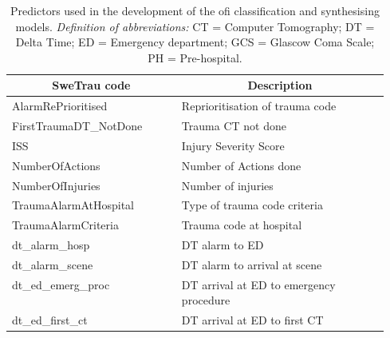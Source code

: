 \documentclass[12pt, letterpaper]{article}
\begin{document}
\begin{appendices}
    \renewcommand*{\arraystretch}{1.2}
    \begin{longtable}[c]{@{}|l|p{0.55\linewidth}|@{}}
        \caption{Predictors used in the development of the \acrlong{ofi} classification and synthesising models. \textit{Definition of abbreviations:} CT = Computer Tomography; DT = Delta Time; ED = Emergency department; GCS = Glascow Coma Scale; PH = Pre-hospital.}%
        \label{tab:predictors}                                                                                          \\
        \hline
        \multicolumn{1}{|c|}{\textbf{SweTrau code}} & \multicolumn{1}{|c|}{\textbf{Description}}                        \\\hline
        \endfirsthead
        \endhead
        AlarmRePrioritised                          & Reprioritisation of trauma code                                   \\\hline
        FirstTraumaDT\_NotDone                      & Trauma CT not done                                                \\\hline
        ISS                                         & Injury Severity Score                                             \\\hline
        NumberOfActions                             & Number of Actions done                                            \\\hline
        NumberOfInjuries                            & Number of injuries                                                \\\hline
        TraumaAlarmAtHospital                       & Type of trauma code criteria                                      \\\hline
        TraumaAlarmCriteria                         & Trauma code at hospital                                           \\\hline
        dt\_alarm\_hosp                             & DT alarm to ED                                                    \\\hline
        dt\_alarm\_scene                            & DT alarm to arrival at scene                                      \\\hline
        dt\_ed\_emerg\_proc                         & DT arrival at ED to emergency procedure                           \\\hline
        dt\_ed\_first\_ct                           & DT arrival at ED to first CT                                      \\\hline

\end{longtable}
\end{appendices}
\end{document}
